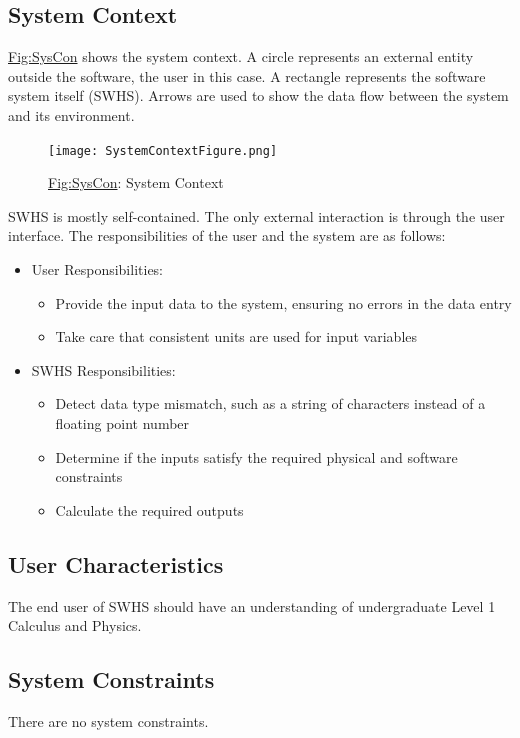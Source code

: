 \documentclass[12pt]{article}
\begin{document}
\subsection{System Context}
\label{Sec:SysContext}
\hyperref[Figure:SysCon]{Fig:SysCon} shows the system context. A circle represents an external entity outside the software, the user in this case. A rectangle represents the software system itself (SWHS). Arrows are used to show the data flow between the system and its environment.
\begin{figure}
\begin{center}
\texttt{[image: SystemContextFigure.png]}
\caption{\hyperref[Figure:SysCon]{Fig:SysCon}: System Context}
\label{Figure:SysCon}
\end{center}
\end{figure}
SWHS is mostly self-contained. The only external interaction is through the user interface. The responsibilities of the user and the system are as follows:
\begin{itemize}
\item{User Responsibilities:}
\begin{itemize}
\item{Provide the input data to the system, ensuring no errors in the data entry}
\item{Take care that consistent units are used for input variables}
\end{itemize}
\item{SWHS Responsibilities:}
\begin{itemize}
\item{Detect data type mismatch, such as a string of characters instead of a floating point number}
\item{Determine if the inputs satisfy the required physical and software constraints}
\item{Calculate the required outputs}
\end{itemize}
\end{itemize}
\subsection{User Characteristics}
\label{Sec:UserChars}
The end user of SWHS should have an understanding of undergraduate Level 1 Calculus and Physics.
\subsection{System Constraints}
\label{Sec:SysConstraints}
There are no system constraints.
\end{document}
